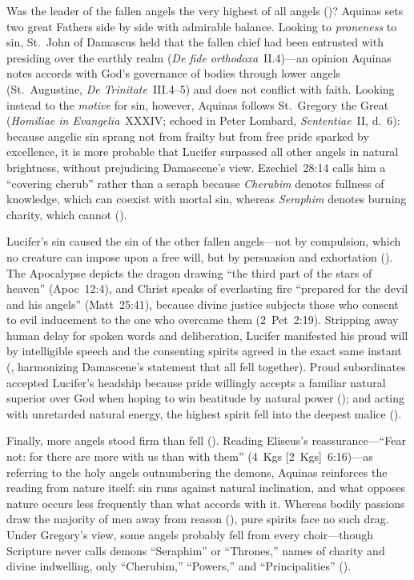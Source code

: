 Was the leader of the fallen angels the very highest of all angels ()? Aquinas sets two great Fathers side by side with admirable balance. Looking to \emph{proneness} to sin, St.~John of Damascus held that the fallen chief had been entrusted with presiding over the earthly realm (\emph{De fide orthodoxa}~II.4)---an opinion Aquinas notes accords with God's governance of bodies through lower angels (St.~Augustine, \emph{De Trinitate}~III.4--5) and does not conflict with faith. Looking instead to the \emph{motive} for sin, however, Aquinas follows St.~Gregory the Great (\emph{Homiliae in Evangelia}~XXXIV; echoed in Peter Lombard, \emph{Sententiae}~II, d.~6): because angelic sin sprang not from frailty but from free pride sparked by excellence, it is more probable that Lucifer surpassed all other angels in natural brightness, without prejudicing Damascene's view. Ezechiel~28:14 calls him a ``covering cherub'' rather than a seraph because \emph{Cherubim} denotes fullness of knowledge, which can coexist with mortal sin, whereas \emph{Seraphim} denotes burning charity, which cannot ().

Lucifer's sin caused the sin of the other fallen angels---not by compulsion, which no creature can impose upon a free will, but by persuasion and exhortation (). The Apocalypse depicts the dragon drawing ``the third part of the stars of heaven'' (Apoc~12:4), and Christ speaks of everlasting fire ``prepared for the devil and his angels'' (Matt~25:41), because divine justice subjects those who consent to evil inducement to the one who overcame them (2~Pet~2:19). Stripping away human delay for spoken words and deliberation, Lucifer manifested his proud will by intelligible speech and the consenting spirits agreed in the exact same instant (, harmonizing Damascene's statement that all fell together). Proud subordinates accepted Lucifer's headship because pride willingly accepts a familiar natural superior over God when hoping to win beatitude by natural power (); and acting with unretarded natural energy, the highest spirit fell into the deepest malice ().

Finally, more angels stood firm than fell (). Reading Eliseus's reassurance---``Fear not: for there are more with us than with them'' (4~Kgs [2~Kgs]~6:16)---as referring to the holy angels outnumbering the demons, Aquinas reinforces the reading from nature itself: sin runs against natural inclination, and what opposes nature occurs less frequently than what accords with it. Whereas bodily passions draw the majority of men away from reason (), pure spirits face no such drag. Under Gregory's view, some angels probably fell from every choir---though Scripture never calls demons ``Seraphim'' or ``Thrones,'' names of charity and divine indwelling, only ``Cherubim,'' ``Powers,'' and ``Principalities'' ().

